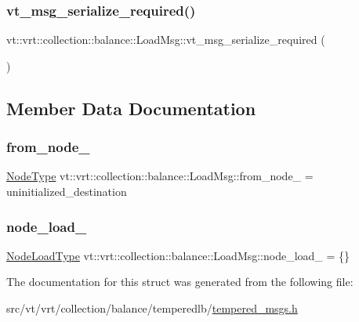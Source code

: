 \subsubsection{\texorpdfstring{vt\+\_\+msg\+\_\+serialize\+\_\+required()}{vt\_msg\_serialize\_required()}}
{\footnotesize\ttfamily vt\+::vrt\+::collection\+::balance\+::\+Load\+Msg\+::vt\+\_\+msg\+\_\+serialize\+\_\+required (\begin{DoxyParamCaption}{ }\end{DoxyParamCaption})}



\subsection{Member Data Documentation}
\mbox{\label{structvt_1_1vrt_1_1collection_1_1balance_1_1_load_msg_a0f4e4ee3be0ec523e6bebe15ddcd3459}} 
\subsubsection{\texorpdfstring{from\+\_\+node\+\_\+}{from\_node\_}}
{\footnotesize\ttfamily \hyperlink{namespacevt_a866da9d0efc19c0a1ce79e9e492f47e2}{Node\+Type} vt\+::vrt\+::collection\+::balance\+::\+Load\+Msg\+::from\+\_\+node\+\_\+ = uninitialized\+\_\+destination\hspace{0.3cm}{\ttfamily [private]}}

\mbox{\label{structvt_1_1vrt_1_1collection_1_1balance_1_1_load_msg_afdbf7d2d139d40c8e04958d2c02bb94d}} 
\subsubsection{\texorpdfstring{node\+\_\+load\+\_\+}{node\_load\_}}
{\footnotesize\ttfamily \hyperlink{structvt_1_1vrt_1_1collection_1_1balance_1_1_load_msg_a65e300c2d6119d11e9121b17f7f94850}{Node\+Load\+Type} vt\+::vrt\+::collection\+::balance\+::\+Load\+Msg\+::node\+\_\+load\+\_\+ = \{\}\hspace{0.3cm}{\ttfamily [private]}}



The documentation for this struct was generated from the following file\+:\begin{DoxyCompactItemize}
\item 
src/vt/vrt/collection/balance/temperedlb/\hyperlink{tempered__msgs_8h}{tempered\+\_\+msgs.\+h}\end{DoxyCompactItemize}
